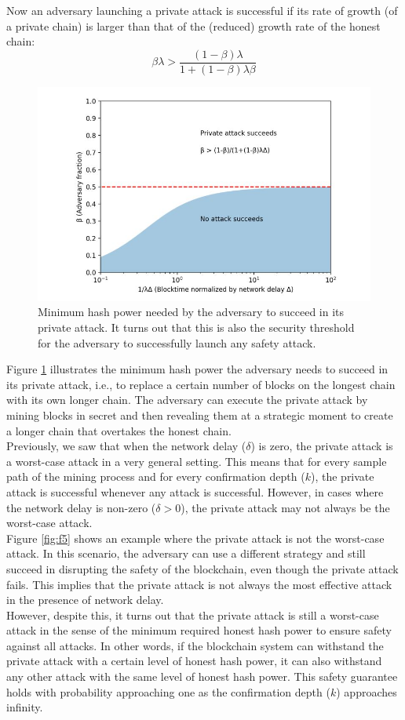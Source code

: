 Now an adversary launching a private attack is successful if its rate of growth (of a private chain) is larger than that of the (reduced) growth rate of the honest chain:
\begin{equation}
    \beta \lambda > \frac{(1 - \beta) \lambda}{1 + (1 - \beta) \lambda \beta}
\end{equation}
\begin{figure}[h!]
    \centering
    \includegraphics[width=0.6\linewidth]{Fig/06/F4}
    \caption{Minimum hash power needed by the adversary to succeed in its private attack. It turns
        out that this is also the security threshold for the adversary to successfully launch any safety attack.}
    \label{fig:f4}
\end{figure}
Figure \ref{fig:f4} illustrates the minimum hash power the adversary needs to succeed in its private attack, i.e., to replace a certain number of blocks on the longest chain with its own longer chain. The adversary can execute the private attack by mining blocks in secret and then revealing them at a strategic moment to create a longer chain that overtakes the honest chain.\\
Previously, we saw that when the network delay ($\delta$) is zero, the private attack is a worst-case attack in a very general setting. This means that for every sample path of the mining process and for every confirmation depth ($k$), the private attack is successful whenever any attack is successful. However, in cases where the network delay is non-zero ($\delta > 0$), the private attack may not always be the worst-case attack.\\
Figure \ref{fig:f5} shows an example where the private attack is not the worst-case attack. In this scenario, the adversary can use a different strategy and still succeed in disrupting the safety of the blockchain, even though the private attack fails. This implies that the private attack is not always the most effective attack in the presence of network delay.\\
However, despite this, it turns out that the private attack is still a worst-case attack in the sense of the minimum required honest hash power to ensure safety against all attacks. In other words, if the blockchain system can withstand the private attack with a certain level of honest hash power, it can also withstand any other attack with the same level of honest hash power. This safety guarantee holds with probability approaching one as the confirmation depth ($k$) approaches infinity.\\
